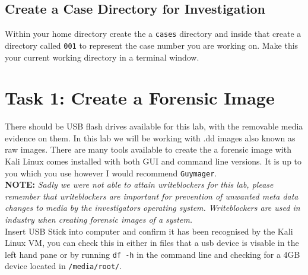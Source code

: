 \documentclass[a4paper,11pt]{article}
\begin{document}
\subsection{Create a Case Directory for Investigation}
Within your home directory create the a \texttt{cases} directory and inside that create a directory called \texttt{001} to represent the case number you are working on. Make this your current working directory in a terminal window.

\newpage
\section{Task 1: Create a Forensic Image}
There should be USB flash drives available for this lab, with the removable media evidence on them.  In this lab we will be working with .dd images also known as raw images. There are many tools available to create the a forensic image with Kali Linux comes installed with both GUI and command line versions. It is up to you which you use however I would recommend \texttt{Guymager}.\\

\textbf{NOTE:} \textit{Sadly we were not able to attain writeblockers for this lab, please remember that writeblockers are important for prevention of unwanted meta data changes to media by the investigators operating system. Writeblockers are used in industry when creating forensic images of a system.}\\

Insert USB Stick into computer and confirm it has been recognised by the Kali Linux VM, you can check this in either in files that a usb device is visable in the left hand pane or by running \texttt{df -h} in the command line and checking for a 4GB device located in \texttt{/media/root/}. \\
\end{document}
